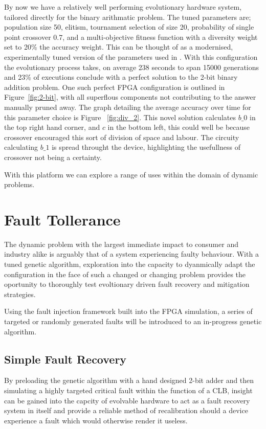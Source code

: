 By now we have a relatively well performing evolutionary hardware system,
tailored directly for the binary arithmatic problem. The tuned parameters
are; population size 50, elitism, tournament selection of size 20,
probability of single point crossover 0.7, and a multi-objective fitness function
with a diversity weight set to 20\% the accuracy weight.
This can be thought of as a modernised, experimentally tuned version of the
parameters used in \cite{10.1007/3-540-63173-9_61}.
With this configuration
the evolutionary process takes, on average 238 seconds to span 15000 generations
and 23\% of executions conclude with a perfect solution to the 2-bit binary addition
problem. One such perfect FPGA configuration is outlined in Figure~\ref{fig:2-bit},
with all superflous components not contributing to the answer manually pruned away.
The graph detailing the average accuracy over time for this parameter choice is Figure
~\ref{fig:div_2}.
This novel solution calculates $b\_0$ in the top right hand corner, and $c$ in the
bottom left, this could well be because crossover encouraged this sort of division
of space and labour. The circuity calculating $b\_1$ is spread throught the device,
highlighting the usefullness of crossover not being a certainty.

With this platform we can explore
a range of uses within the domain of dynamic problems.

\section{Fault Tollerance}

The dynamic problem with the largest immediate impact to consumer and industry
alike is arguably that of a system experiencing faulty behaviour.
With a tuned genetic algorithm, exploration into the capacity to dyanmically
adapt the configuration in the face of such a changed or changing problem provides
the oportunity to thoroughly test evoltionary driven fault recovery and mitigation
strategies.

Using the fault injection framework built into the FPGA simulation, a series
of targeted or randomly generated faults will be introduced to an in-progress
genetic algorithm.

\subsection{Simple Fault Recovery}

By preloading the genetic algorithm with a hand designed 2-bit adder
and then
simulating a highly targeted critical fault within the function of a CLB, insight
can be gained into the capcity of evolvable hardware to act as a fault recovery
system in itself and provide a reliable method of recalibration should a device
experience a fault which would otherwise render it useless.

